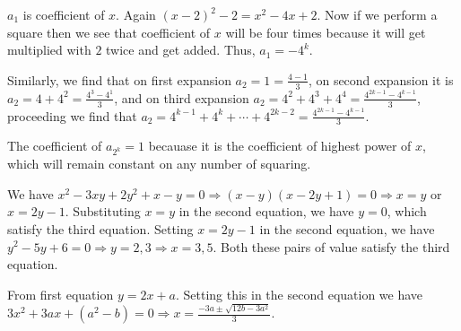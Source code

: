   $a_1$ is coefficient of $x$. Again $(x - 2)^2 - 2= x^2 - 4x + 2$. Now if we perform a square then we see
  that coefficient of $x$ will be four times because it will get multiplied with $2$ twice and get
  added. Thus, $a_1 = -4^k$.

  Similarly, we find that on first expansion $a_2 = 1 = \frac{4 - 1}{3}$, on second expansion it is $a_2 =
  4 + 4^2 = \frac{4^3 - 4^1}{3}$, and on third expansion $a_2 = 4^2 + 4^3 + 4^4 = \frac{4^{2k
      - 1} - 4^{k - 1}}{3}$, proceeding we find that $a_2 = 4^{k-1} + 4^{k} + \cdots + 4^{2k - 2} =
  \frac{4^{2k - 1} - 4^{k - 1}}{3}$.

  The coefficient of $a_{2^k} = 1$ becauase it is the coefficient of highest power of $x$, which will remain
  constant on any number of squaring.
\item We have $x^2 - 3xy + 2y^2 + x - y = 0 \Rightarrow (x - y)(x - 2y + 1) = 0\Rightarrow x = y$ or $x = 2y
  - 1$. Substituting $x = y$ in the second equation, we have $y = 0$, which satisfy the third
  equation. Setting  $x = 2y - 1$ in the second equation, we have $y^2 - 5y + 6 = 0 \Rightarrow y = 2,3
  \Rightarrow x = 3, 5$. Both these pairs of value satisfy the third equation.
\item From first equation $y = 2x + a$. Setting this in the second equation we have $3x^2 + 3ax + (a^2 - b)
  = 0 \Rightarrow x = \frac{-3a \pm\sqrt{12b - 3a^2}}{3}$.


